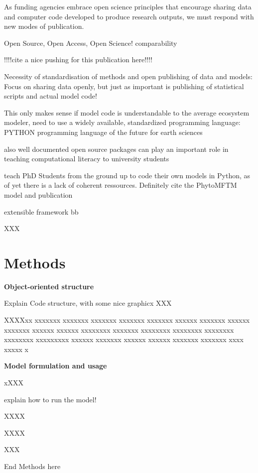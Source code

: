 As funding agencies embrace open science principles that encourage sharing data and computer code developed to produce research outputs, we must respond with new modes of publication.

Open Source, Open Access, Open Science!
comparability

!!!!cite a nice pushing for this publication here!!!!

Necessity of standardisation of methods and open publishing of data and models: \citep{Reichman2011}
Focus on sharing data openly, but just as important is publishing of statistical scripts and actual model code!

This only makes sense if model code is understandable to the average ecosystem modeler, need to use a widely available, standardized programming language:
PYTHON
programming language of the future for earth sciences \citep{Lin2012}

also well documented open source packages can play an important role in teaching computational literacy to university students \citep{Farrell2018}



teach PhD Students from the ground up to code their own models in Python, as of yet there is a lack of coherent ressources. Definitely cite the PhytoMFTM model and publication \citep{AcevedoTrejos2016}

extensible framework
bb



XXX

\section{Methods}



\small {\textbf{Object-oriented structure}}

Explain Code structure, with some nice graphicx
XXX

XXXXxx xxxxxxx xxxxxxx xxxxxxx xxxxxxx xxxxxxx xxxxxx xxxxxxx xxxxxx xxxxxxx xxxxxx xxxxxx xxxxxxxx xxxxxxx xxxxxxxx xxxxxxxx xxxxxxxx xxxxxxxx xxxxxxxxx xxxxxx xxxxxxx xxxxxx xxxxxx xxxxxxx xxxxxxx xxxx xxxxx x


\noindent \small {\textbf{Model formulation and usage}}

xXXX

explain how to run the model!

XXXX

XXXX

XXX


End Methods here
